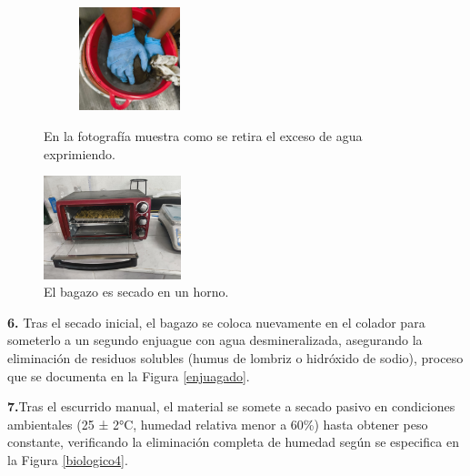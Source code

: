 \documentclass[12pt]{article}
\begin{document}
	
	

	
		\begin{figure}[H]
		\centering
		\begin{minipage}{0.46\textwidth}
			\centering
			\includegraphics[width=5cm, height=3cm]{imagenes/biologico3} %
			\caption{En la fotografía muestra como se retira el exceso de agua exprimiendo.}
			\label{biologico3}
		\end{minipage}
		\hfill
		\begin{minipage}{0.48\textwidth}
			\centering
			\includegraphics[width=4cm, height=3cm]{imagenes/secado2} %
			\caption{El bagazo es secado en un horno.}
			\label{secado2}
		\end{minipage}
	\end{figure}
	
	
	
		\textbf{6.} Tras el secado inicial, el bagazo se coloca nuevamente en el colador para someterlo a un segundo enjuague con agua desmineralizada, asegurando la eliminación de residuos solubles (humus de lombriz o hidróxido de sodio), proceso que se documenta en la Figura \ref{enjuagado}.
		
	
		
	  \textbf{7.}Tras el escurrido manual, el material se somete a secado pasivo en condiciones ambientales (25 ± 2°C, humedad relativa menor a 60\%) hasta obtener peso constante, verificando la eliminación completa de humedad según se especifica en la Figura \ref{biologico4}.
	
\end{document}
